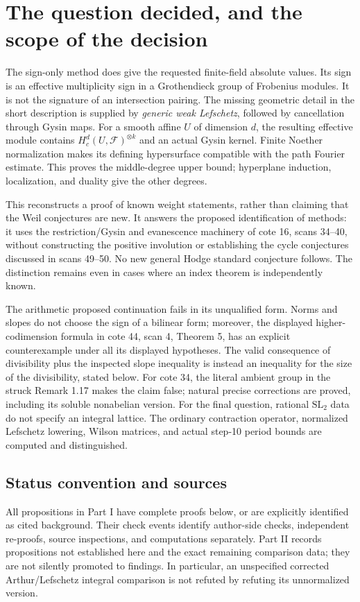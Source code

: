 \section{The question decided, and the scope of the decision}

The sign-only method does give the requested finite-field absolute values.
Its sign is an effective multiplicity sign in a Grothendieck group of
Frobenius modules.  It is not the signature of an intersection pairing.
The missing geometric detail in the short description is supplied by
\emph{generic weak Lefschetz}, followed by cancellation through Gysin maps.
For a smooth affine $U$ of dimension $d$, the resulting effective module
contains $H_c^d(U,\mathcal F)^{\otimes k}$ and an actual Gysin kernel.
Finite Noether normalization makes its defining hypersurface compatible
with the path Fourier estimate.  This proves the middle-degree upper bound;
hyperplane induction, localization, and duality give the other degrees.

This reconstructs a proof of known weight statements, rather than claiming
that the Weil conjectures are new.  It answers the proposed identification
of methods: it uses the restriction/Gysin and evanescence machinery of
cote 16, scans 34--40, without constructing the positive involution or
establishing the cycle conjectures discussed in scans 49--50.  No new general
Hodge standard conjecture follows.  The distinction remains even in cases
where an index theorem is independently known.

The arithmetic proposed continuation fails in its unqualified form.
Norms and slopes do not choose the sign of a bilinear form; moreover,
the displayed higher-codimension formula in cote 44, scan 4, Theorem 5,
has an explicit counterexample under all its displayed hypotheses.
The valid consequence of divisibility plus the inspected slope inequality
is instead an inequality for the size of the divisibility, stated below.
For cote 34, the literal ambient group in the struck Remark 1.17 makes the
claim false; natural precise corrections are proved, including its soluble
nonabelian version.  For the final question, rational $\mathrm{SL}_2$ data
do not specify an integral lattice.  The ordinary contraction operator,
normalized Lefschetz lowering, Wilson matrices, and actual step-10 period
bounds are computed and distinguished.

\subsection*{Status convention and sources}
All propositions in Part I have complete proofs below, or are explicitly
identified as cited background.  Their check events identify author-side
checks, independent re-proofs, source inspections, and computations separately.
Part II records propositions not established here and the exact remaining
comparison data; they are not silently promoted to findings.  In particular,
an unspecified corrected Arthur/Lefschetz integral comparison is not refuted
by refuting its unnormalized version.

